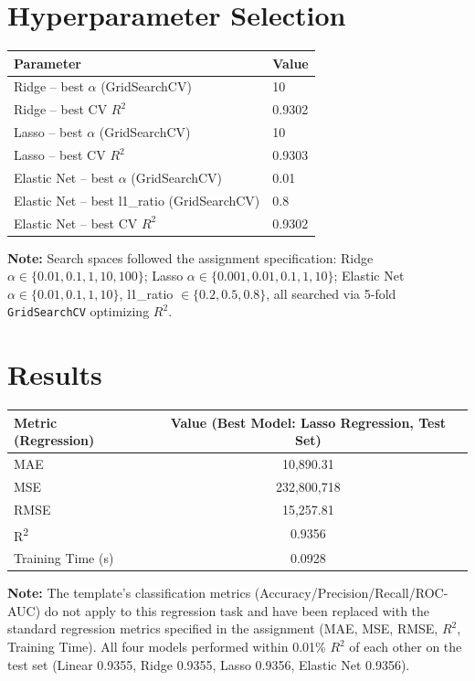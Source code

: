 \documentclass[12pt,a4paper]{article}
\begin{document}
\section{Hyperparameter Selection}

\begin{tabular}{ll}
\toprule
Parameter & Value\\
\midrule
Ridge -- best $\alpha$ (GridSearchCV) & 10 \\
Ridge -- best CV $R^2$ & 0.9302 \\
Lasso -- best $\alpha$ (GridSearchCV) & 10 \\
Lasso -- best CV $R^2$ & 0.9303 \\
Elastic Net -- best $\alpha$ (GridSearchCV) & 0.01 \\
Elastic Net -- best l1\_ratio (GridSearchCV) & 0.8 \\
Elastic Net -- best CV $R^2$ & 0.9302 \\
\bottomrule
\end{tabular}

\textbf{Note:} Search spaces followed the assignment specification: Ridge
$\alpha \in \{0.01, 0.1, 1, 10, 100\}$; Lasso $\alpha \in \{0.001, 0.01, 0.1, 1, 10\}$;
Elastic Net $\alpha \in \{0.01, 0.1, 1, 10\}$, l1\_ratio $\in \{0.2, 0.5, 0.8\}$, all searched
via 5-fold \texttt{GridSearchCV} optimizing $R^2$.

\section{Results}

\begin{tabular}{lc}
\toprule
Metric (Regression) & Value (Best Model: Lasso Regression, Test Set)\\
\midrule
MAE & 10{,}890.31 \\
MSE & 232{,}800{,}718 \\
RMSE & 15{,}257.81 \\
R\textsuperscript{2} & 0.9356 \\
Training Time (s) & 0.0928 \\
\bottomrule
\end{tabular}

\textbf{Note:} The template's classification metrics (Accuracy/Precision/Recall/ROC-AUC) do
not apply to this regression task and have been replaced with the standard regression
metrics specified in the assignment (MAE, MSE, RMSE, $R^2$, Training Time). All four models
performed within 0.01\% $R^2$ of each other on the test set (Linear 0.9355, Ridge 0.9355,
Lasso 0.9356, Elastic Net 0.9356).
\end{document}
